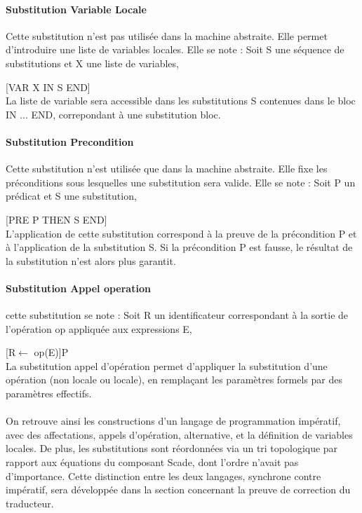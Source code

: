 \paragraph{Substitution Variable Locale}
Cette substitution n'est pas utilisée dans la machine abstraite. Elle permet
d'introduire une liste de variables locales.
Elle se note : Soit S une séquence de substitutions et X une liste de variables,

[VAR X IN S END]\\
La liste de variable sera accessible dans les substitutions S contenues dans le
bloc IN ... END, correpondant à une substitution bloc.

\paragraph{Substitution Precondition}
Cette substitution n'est utilisée que dans la machine abstraite. Elle fixe les
préconditions sous lesquelles une substitution sera valide. Elle se note : Soit P
un prédicat et S une substitution,

[PRE P THEN S END]\\
L'application de cette substitution correspond à la preuve de la
précondition P et à l'application de la substitution S. Si la
précondition P est fausse, le résultat de la substitution n'est alors
plus garantit.

\paragraph{Substitution Appel operation}
cette substitution se note : Soit R un identificateur correspondant à la sortie
de l'opération op appliquée aux expressions E, 

[R$\leftarrow$ op(E)]P\\
La  substitution appel d’opération permet d’appliquer la substitution
d’une opération (non locale ou locale), en remplaçant les paramètres
formels par des paramètres effectifs. 

\paragraph{}
On retrouve ainsi les constructions d'un langage de programmation
impératif, avec des affectations, appels d'opération, alternative, et la
définition de variables locales. De plus, les substitutions sont
réordonnées via un tri topologique par rapport aux équations du composant
Scade, dont l'ordre n'avait pas d'importance. Cette distinction entre
les deux langages, synchrone contre impératif, sera développée dans la
section concernant la preuve de correction du traducteur.


